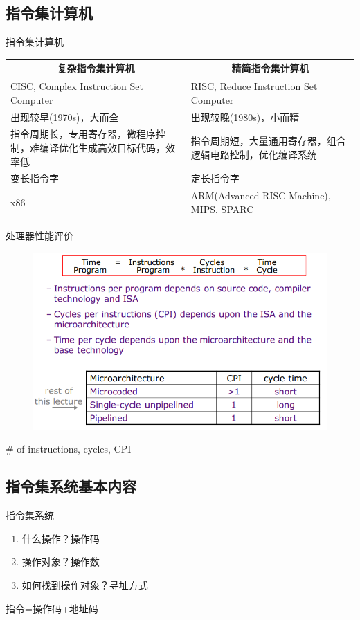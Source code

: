 \documentclass{myslide}
\begin{document}
\subsection{指令集计算机}
\begin{frame}[fragile]{指令集计算机}
\begin{center}
\begin{tabular}{|p{5cm}|p{5cm}|}
\hline
\multicolumn{1}{|c|}{\textbf{复杂指令集计算机}} & \multicolumn{1}{c|}{\textbf{精简指令集计算机}} \\\hline
CISC, Complex Instruction Set Computer & RISC, Reduce Instruction Set Computer\\\hline
出现较早(1970s)，大而全 & 出现较晚(1980s)，小而精 \\\hline
指令周期长，专用寄存器，微程序控制，难编译优化生成高效目标代码，效率低 & 指令周期短，大量通用寄存器，组合逻辑电路控制，优化编译系统\\\hline
变长指令字 & 定长指令字 \\\hline
x86 & ARM(Advanced RISC Machine), MIPS, SPARC \\\hline
\end{tabular}
\end{center}
\end{frame}

\begin{frame}{处理器性能评价}
\begin{figure}
\centering
\includegraphics[width=\linewidth]{fig/Lecture2/processor_performance.PNG}
\end{figure}
\# of instructions, cycles, CPI
\end{frame}

\subsection{指令集系统基本内容}
\begin{frame}{指令集系统}
\begin{enumerate}
	\item 什么操作？操作码
	\item 操作对象？操作数
	\item 如何找到操作对象？寻址方式 %
\end{enumerate}
指令=操作码+地址码
\end{frame}
\end{document}
